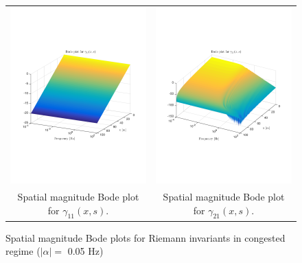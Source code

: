 \documentclass[preprint]{elsarticle}
\begin{document}
\begin{figure}
\centering
\begin{tabular}{cc}
\includegraphics[trim = 0mm 60mm 0mm 60mm, width = 8cm]{distr_gamma_11}
&
\includegraphics[trim = 0mm 60mm 0mm 60mm, width = 8cm]{distr_gamma_21}
\tabularnewline
Spatial magnitude Bode plot for $\gamma_{11}(x,s)$.
&
Spatial magnitude Bode plot for $\gamma_{21}(x,s)$.
\tabularnewline
\end{tabular}
\caption{Spatial magnitude Bode plots for Riemann invariants in congested regime ($\left|\alpha\right| = $ 0.05 Hz)\label{fig:Magn_spatial_diag_congested}}
\end{figure}
\end{document}
